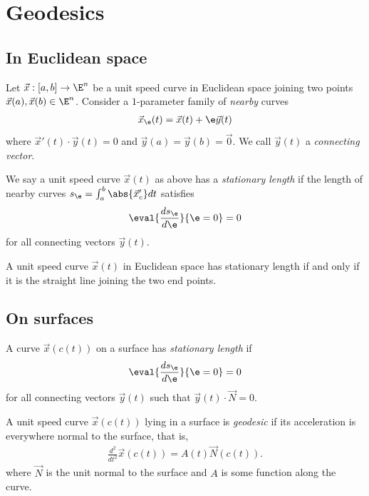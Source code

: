 \documentclass{article}
\begin{document}
\section{Geodesics}

\subsection{In Euclidean space}

\begin{definition}
	Let $\vec x:[a,b]\to\E^n$ be a unit speed curve in Euclidean space joining two points
	$\vec x(a),\vec x(b)\in\E^n$. Consider a $1$-parameter family of \emph{nearby} curves
	\begin{align*}
		\vec x_\e (t) = \vec x(t) + \e\vec y(t)
	\end{align*}
	where $\vec x'(t) \cdot \vec y(t)  = 0$ and $\vec y(a)=\vec y(b)=\vec 0$.
	We call $\vec y(t)$ a \emph{connecting vector}.
\end{definition}

\begin{definition}
	We say a unit speed curve $\vec x(t)$ as above has a \emph{stationary length} if
	the length of nearby curves $s_\e = \int_a^b \abs{\vec x'_c} dt$ satisfies
	\begin{align*}
		\eval{\frac{ds_\e}{d\e }}{\e=0}=0
	\end{align*}
	for all connecting vectors $\vec y(t)$.
\end{definition}

\begin{proposition}[Notes 12.3]
	A unit speed curve $\vec x(t)$ in Euclidean space has stationary length if and only if
	it is the straight line joining the two end points.
\end{proposition}

\subsection{On surfaces}

\begin{definition}
	A curve $\vec x(c(t))$ on a surface has \emph{stationary length} if
	\begin{align*}
		\eval{\frac{ds_\e}{d\e}}{\e=0}=0
	\end{align*}
	for all connecting vectors $\vec y(t)$ such that $\vec y(t)\cdot\vec N=0$.
\end{definition}

\begin{definition}
	A unit speed curve $\vec x(c(t))$ lying in a surface is \emph{geodesic} if its acceleration
	is everywhere normal to the surface, that is,
	\begin{align*}
		\frac{d^2}{dt^2}\vec x(c(t)) = A(t)\vec N(c(t)).
	\end{align*}
	where $\vec N$ is the unit normal to the surface and $A$ is some function along the curve.
\end{definition}
\end{document}
